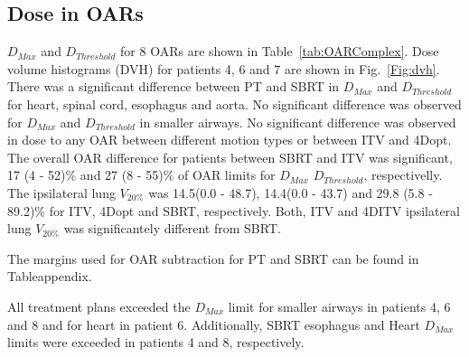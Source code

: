 \begin{table}[H]
\begin{tabular}{c|c|c|c|c}
\hline\hline
	\end{tabular}
	\label{tab:resultsComplex}
\end{table}

\subsection{Dose in OARs}

$D_{Max}$ and $D_{Threshold}$ for 8 OARs are shown in Table~\ref{tab:OARComplex}. Dose volume histograms (DVH) for patients 4, 6 and 7 are shown in Fig.~\ref{Fig:dvh}.
There was a significant difference between PT and SBRT in $D_{Max}$ and $D_{Threshold}$ 
for heart, spinal cord, esophagus and aorta. No significant difference was observed for $D_{Max}$ and $D_{Threshold}$ in smaller airways.
No significant difference was observed in dose to any OAR between different motion types or between ITV and 4Dopt.
The overall OAR difference for patients between SBRT and ITV
was significant, 17 (4 - 52)\% and 27 (8 - 55)\% of OAR limits for $D_{Max}$ $D_{Threshold}$, respectivelly.
The ipsilateral lung $V_{20\%}$ was 14.5(0.0 - 48.7), 14.4(0.0 - 43.7) and 29.8 (5.8 - 89.2)\% for ITV, 4Dopt and SBRT, respectively. Both, ITV and 4DITV ipsilateral lung $V_{20\%}$ was
significantely different from SBRT.

The margins used for OAR subtraction for PT and SBRT can be found in Tableappendix.

All treatment plans exceeded the $D_{Max}$ limit for smaller airways in patients 4, 6 and 8 and for heart in patient 6. 
Additionally, SBRT esophagus and Heart $D_{Max}$ limits were exceeded in patients 4 and 8, respectively.


